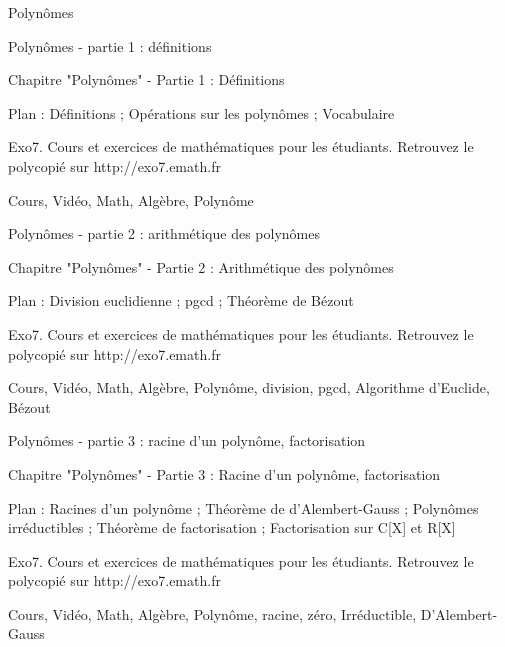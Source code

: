
   Polynômes

Polynômes - partie 1 : définitions



Chapitre "Polynômes" - Partie 1 : Définitions

Plan : Définitions ; Opérations sur les polynômes ; Vocabulaire

Exo7. Cours et exercices de mathématiques pour les étudiants.
Retrouvez le polycopié sur http://exo7.emath.fr


Cours, Vidéo, Math, Algèbre, Polynôme 



Polynômes - partie 2 : arithmétique des polynômes



Chapitre "Polynômes" - Partie 2 : Arithmétique des polynômes

Plan : Division euclidienne ; pgcd ; Théorème de Bézout

Exo7. Cours et exercices de mathématiques pour les étudiants.
Retrouvez le polycopié sur http://exo7.emath.fr


Cours, Vidéo, Math, Algèbre, Polynôme, division, pgcd, Algorithme d'Euclide, Bézout



Polynômes - partie 3 : racine d'un polynôme, factorisation



Chapitre "Polynômes" - Partie 3 : Racine d'un polynôme, factorisation

Plan : Racines d'un polynôme ; Théorème de d'Alembert-Gauss ; Polynômes irréductibles ; Théorème de factorisation ;
Factorisation sur C[X] et R[X]

Exo7. Cours et exercices de mathématiques pour les étudiants.
Retrouvez le polycopié sur http://exo7.emath.fr


Cours, Vidéo, Math, Algèbre, Polynôme, racine, zéro, Irréductible, D'Alembert-Gauss



